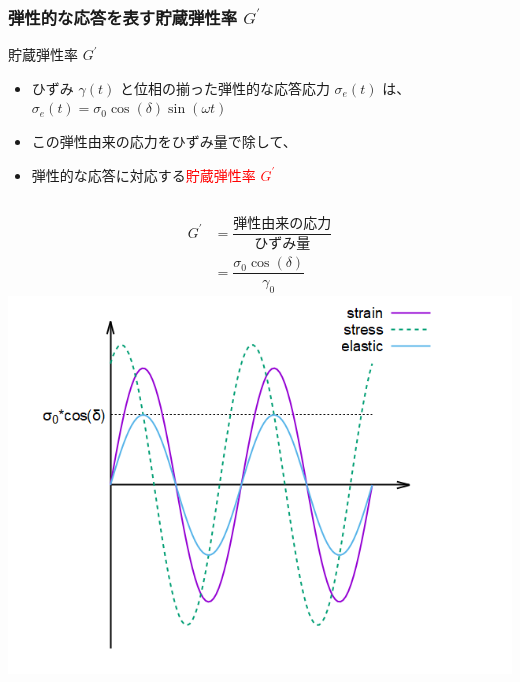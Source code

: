 \documentclass[unicode,12pt]{beamer}%
\begin{document}
\begin{frame}
    \frametitle{弾性的な応答を表す貯蔵弾性率 $G^{\prime}$}
		
		\begin{alertblock}{貯蔵弾性率 $G^{\prime}$}
			\begin{itemize}
				\item ひずみ $\gamma(t)$ と位相の揃った弾性的な応答応力 $\sigma_e(t)$ は、\\
				$\sigma_e(t) = \sigma_0 \cos(\delta)\sin(\omega t)$
				\item この弾性由来の応力をひずみ量で除して、
				\item 弾性的な応答に対応する\textcolor{red}{貯蔵弾性率 $G^{\prime}$}
			\end{itemize}
			\begin{columns}[c, onlytextwidth]
						\begin{align*}
							G^{\prime} &= \dfrac{\text{弾性由来の応力}}{\text{ひずみ量}} \\
							&= \dfrac{\sigma_0 \cos(\delta)}{\gamma_0}
						\end{align*}
					\centering
					\includegraphics[width=\textwidth]{dynamic_rheo/dyn_rheo_ela.png}
			\end{columns}
		\end{alertblock}
\end{frame}
\end{document}

